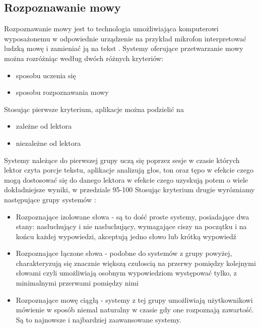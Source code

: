 \subsection{Rozpoznawanie mowy}
Rozpoznawanie mowy jest to technologia umożliwiająca komputerowi wyposażonemu w odpowiednie urządzenie na przykład mikrofon interpretować ludzką mowę i zamieniać ją na tekst \cite{douglas2002}. Systemy oferujące przetwarzanie mowy można rozróżniąc według dwóch różnych kryteriów:
\begin{itemize}
	\item sposobu uczenia się
	\item sposobu rozpoznawania mowy
\end{itemize}
Stosując pierwsze kryterium, aplikacje można podzielić na
\begin{itemize}
	\item zależne od lektora
	\item niezależne od lektora
\end{itemize}
Systemy należące do pierwszej grupy uczą się poprzez sesje w czasie których lektor czyta porcje tekstu, aplikacje analizują głos, ton oraz tępo  w efekcie czego mogą dostosować się do danego lektora w efekcie czego uzyskują potem o wiele dokładniejsze wyniki, w przedziale 95-100%
Stosując kryterium drugie wyrózniamy następujące grupy systemów \cite{gaikwad2010} :
\begin{itemize}
	\item Rozpoznające izolowane słowa - są to dość proste systemy, posiadające dwa stany: nasłuchujący i nie nasłuchujący,  wymagające ciszy na początku i na końcu każdej wypowiedzi,  akceptują jedno słowo lub krótką wypowiedź 
	\item Rozpoznające łączone słowa - podobne do systemów z grupy powyżej, charakteryzują się znacznie większą czułoscią na przerwy pomiędzy kolejnymi słowami czyli umożliwiają osobnym wypowiedziom występować tylko, z minimalnymi przerwami pomiędzy nimi
	\item Rozpoznające mowę ciągłą -  systemy z tej grupy umożliwiają użytkownikowi mówienie w sposób niemal naturalny w czasie gdy one rozpoznają zawartość. Są to najnowsze i najbardziej zaawansowane systemy.
\end{itemize}
